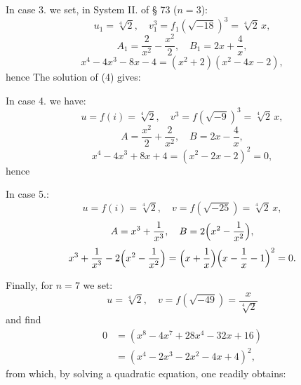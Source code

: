 In case 3. we set, in System II. of § 73 ($n=3$):
\[
u_1=\sqrt[4]{2},\quad v_1^3=f_1(\sqrt{-18})^3=\sqrt[4]{2}\,x,
\]
\[
A_1=\frac{2}{x^2}-\frac{x^2}{2},\quad B_1=2x+\frac{4}{x},
\]
\[
x^4-4x^3-8x-4=(x^2+2)(x^2-4x-2),
\]
hence
The solution of (4) gives:

In case 4. we have:
\[
u=f(i)=\sqrt[4]{2},\quad v^3=f(\sqrt{-9})^3=\sqrt[4]{2}\,x,
\]
\[
A=\frac{x^2}{2}+\frac{2}{x^2},\quad B=2x-\frac{4}{x},
\]
\[
x^4-4x^3+8x+4=(x^2-2x-2)^2=0,
\]
hence

In case 5.:
\[
u=f(i)=\sqrt[4]{2},\quad v=f(\sqrt{-25})=\sqrt[4]{2}\,x,
\]
\[
A=x^3+\frac{1}{x^3},\quad B=2\Bigl(x^2-\frac{1}{x^2}\Bigr),
\]
\[
x^3+\frac{1}{x^3}-2\Bigl(x^2-\frac{1}{x^2}\Bigr)=\Bigl(x+\frac{1}{x}\Bigr)\Bigl(x-\frac{1}{x}-1\Bigr)^2=0.
\]

Finally, for $n=7$ we set:
\[
u=\sqrt[4]{2},\quad v=f(\sqrt{-49})=\frac{x}{\sqrt[4]{2}}
\]
and find
\[
\begin{aligned}
0 &= (x^8-4x^7+28x^4-32x+16)\\
  &= (x^4-2x^3-2x^2-4x+4)^2,
\end{aligned}
\]
from which, by solving a quadratic equation, one readily obtains:
